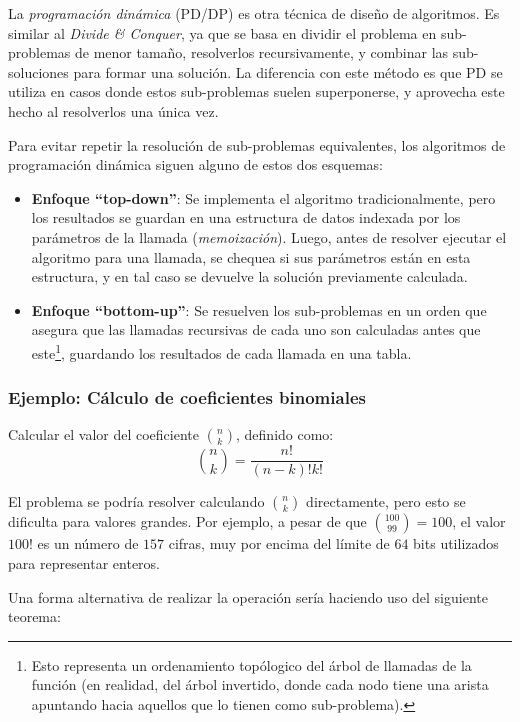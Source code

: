 \documentclass[a4paper]{report}
\begin{document}
La \textit{programación dinámica} (PD/DP) es otra técnica de diseño de algoritmos. Es similar al \textit{Divide \& Conquer}, ya que se basa en dividir el problema en sub-problemas de menor tamaño, resolverlos recursivamente, y combinar las sub-soluciones para formar una solución. La diferencia con este método es que PD se utiliza en casos donde estos sub-problemas suelen superponerse, y aprovecha este hecho al resolverlos una única vez.

Para evitar repetir la resolución de sub-problemas equivalentes, los algoritmos de programación dinámica siguen alguno de estos dos esquemas:
\begin{itemize}
    \item \textbf{Enfoque ``top-down''}: Se implementa el algoritmo tradicionalmente, pero los resultados se guardan en una estructura de datos indexada por los parámetros de la llamada (\textit{memoización}). Luego, antes de resolver ejecutar el algoritmo para una llamada, se chequea si sus parámetros están en esta estructura, y en tal caso se devuelve la solución previamente calculada.
    \item \textbf{Enfoque ``bottom-up''}: Se resuelven los sub-problemas en un orden que asegura que las llamadas recursivas de cada uno son calculadas antes que este\footnote{Esto representa un ordenamiento topólogico del árbol de llamadas de la función (en realidad, del árbol invertido, donde cada nodo tiene una arista apuntando hacia aquellos que lo tienen como sub-problema).}, guardando los resultados de cada llamada en una tabla.
\end{itemize}

\subsubsection{Ejemplo: Cálculo de coeficientes binomiales}

\begin{problema}
    Calcular el valor del coeficiente $\binom{n}{k}$, definido como:
    $$\binom{n}{k} = \frac{n!}{(n-k)!k!}$$
\end{problema}

El problema se podría resolver calculando $\binom{n}{k}$ directamente, pero esto se dificulta para valores grandes. Por ejemplo, a pesar de que $\binom{100}{99} = 100$, el valor $100!$ es un número de $157$ cifras, muy por encima del límite de $64$ bits utilizados para representar enteros.

Una forma alternativa de realizar la operación sería haciendo uso del siguiente teorema:
\end{document}
